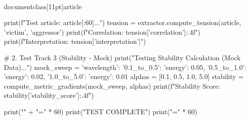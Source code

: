 \\documentclass[11pt]{article}
\begin{document}
\begin{CodeBlock}
    print(f"\n[Track 1.5] Test article: {article[:60]}...")
    tension = extractor.compute_tension(article, 'victim', 'aggressor')
    print(f"Correlation: {tension['correlation']:.4f}")
    print(f"Interpretation: {tension['interpretation']}")
    
    # 2. Test Track 3 (Stability - Mock)
    print("\n[Track 3] Testing Stability Calculation (Mock Data)...")
    mock_sweep = {
        'wavelength': {
            '0.1_to_0.5': {'energy': 0.05},
            '0.5_to_1.0': {'energy': 0.02},
            '1.0_to_5.0': {'energy': 0.01}
        }
    }
    alphas = [0.1, 0.5, 1.0, 5.0]
    stability = compute_metric_gradients(mock_sweep, alphas)
    print(f"Stability Score: {stability['stability_score']:.4f}")
    
    print("\n" + "=" * 60)
    print("TEST COMPLETE")
    print("=" * 60)
\end{CodeBlock}
\end{document}
